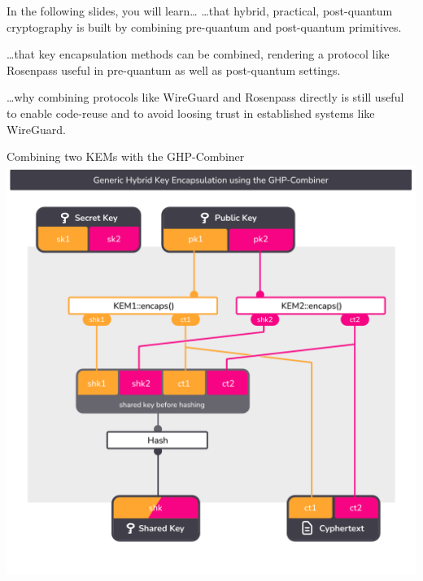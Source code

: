 
\begin{frame}[light,s]{In the following slides, you will learn…}
	\vfill
  …that hybrid, practical, post-quantum cryptography is built by combining pre-quantum and post-quantum primitives.

	\vfill
  …that key encapsulation methods can be combined, rendering a protocol like Rosenpass useful in pre-quantum as well
  as post-quantum settings.

  \vfill
  …why combining protocols like WireGuard and Rosenpass directly is still useful to enable code-reuse and to avoid
  loosing trust in established systems like WireGuard.
  \vfill
\end{frame}

\begin{frame}{Combining two KEMs with the GHP-Combiner}
  \centering
  \includegraphics[height=\defaultframetextheight,page=1,clip=true,trim={0.5cm 1cm 0.7cm 1.5cm}]{graphics/rosenpass-encapsulation-combiner.pdf}
\end{frame}

